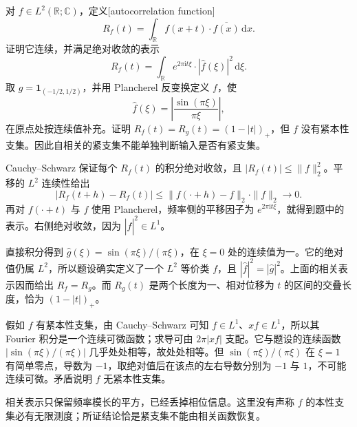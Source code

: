 \begin{optionalexercise}\label{b2:ex:20-new-5}
对 \(f\in L^2(\mathbb R;\mathbb C)\)，定义[autocorrelation function]
\[
 R_f(t)=\int_{\mathbb R}f(x+t)\cdot\overline{f(x)}\,\mathrm dx.
\]
证明它连续，并满足绝对收敛的表示
\[
 R_f(t)=\int_{\mathbb R}e^{2\pi\mathrm i t\xi}
                           \cdot|\widehat f(\xi)|^2\,\mathrm d\xi.
\]
取 \(g=\mathbf1_{(-1/2,1/2)}\)，并用 Plancherel 反变换定义 \(f\)，使
\[
 \widehat f(\xi)=\left|\frac{\sin(\pi\xi)}{\pi\xi}\right|,
\]
在原点处按连续值补充。证明 \(R_f(t)=R_g(t)=(1-|t|)_+\)，但 \(f\) 没有紧本性支集。因此自相关的紧支集不能单独判断输入是否有紧支集。
\end{optionalexercise}
\begin{solution}
Cauchy--Schwarz 保证每个 \(R_f(t)\) 的积分绝对收敛，且 \(|R_f(t)|\leq\|f\|_2^2\)。平移的 \(L^2\) 连续性给出
\[
 |R_f(t+h)-R_f(t)|
 \leq\|f(\cdot+h)-f\|_2\cdot\|f\|_2\longrightarrow0.
\]
再对 \(f(\cdot+t)\) 与 \(f\) 使用 Plancherel，频率侧的平移因子为 \(e^{2\pi\mathrm i t\xi}\)，就得到题中的表示。右侧绝对收敛，因为 \(|\widehat f|^2\in L^1\)。

直接积分得到
\(\widehat g(\xi)=\sin(\pi\xi)/(\pi\xi)\)，在 \(\xi=0\) 处的连续值为一。它的绝对值仍属 \(L^2\)，所以题设确实定义了一个 \(L^2\) 等价类 \(f\)，且 \(|\widehat f|^2=|\widehat g|^2\)。上面的相关表示因而给出 \(R_f=R_g\)。而 \(R_g(t)\) 是两个长度为一、相对位移为 \(t\) 的区间的交叠长度，恰为 \((1-|t|)_+\)。

假如 \(f\) 有紧本性支集，由 Cauchy--Schwarz 可知 \(f\in L^1\)、\(xf\in L^1\)，所以其 Fourier 积分是一个连续可微函数；求导可由 \(2\pi|xf|\) 支配。它与题设的连续函数 \(|\sin(\pi\xi)/(\pi\xi)|\) 几乎处处相等，故处处相等。但 \(\sin(\pi\xi)/(\pi\xi)\) 在 \(\xi=1\) 有简单零点，导数为 \(-1\)，取绝对值后在该点的左右导数分别为 \(-1\) 与 \(1\)，不可能连续可微。矛盾说明 \(f\) 无紧本性支集。

相关表示只保留频率模长的平方，已经丢掉相位信息。这里没有声称 \(f\) 的本性支集必有无限测度；所证结论恰是紧支集不能由相关函数恢复。
\end{solution}

